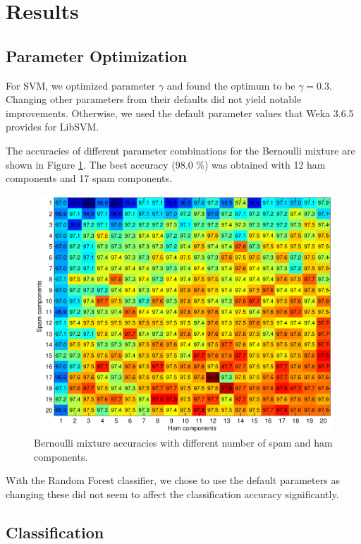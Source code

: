 \section{Results} \label{sec:results}

\subsection{Parameter Optimization}

For SVM, we optimized parameter $\gamma$ and found the optimum to be
$\gamma = 0.3$. Changing other parameters from their defaults did not
yield notable improvements. Otherwise, we used the default parameter
values that Weka 3.6.5 provides for LibSVM.

The accuracies of different parameter combinations for the Bernoulli
mixture are shown in Figure \ref{fig:bmix}. The best
accuracy (98.0 \%) was obtained with 12 ham components and 17 spam
components.

\begin{figure}[!ht]
\centering
\includegraphics[width=\linewidth]{../results/bmix_opt.pdf}
\caption{Bernoulli mixture accuracies with different number of spam and ham components.}
\label{fig:bmix}
\end{figure}

With the Random Forest classifier, we chose to use the default
parameters as changing these did not seem to affect the classification
accuracy significantly.

\subsection{Classification}

